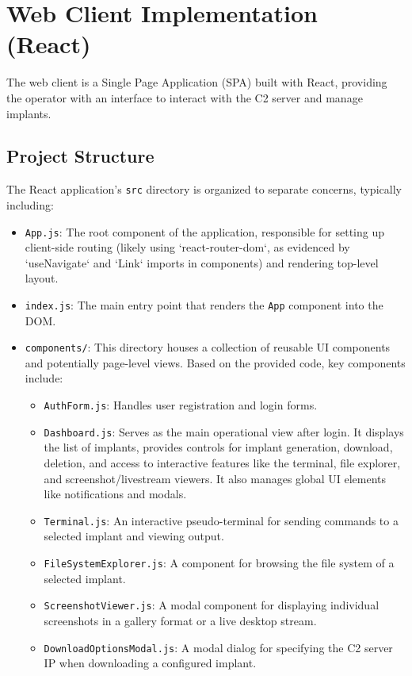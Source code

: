 \section{Web Client Implementation (React)}
The web client is a Single Page Application (SPA) built with React, providing the operator with an interface to interact with the C2 server and manage implants.

\subsection{Project Structure}
The React application's \texttt{src} directory is organized to separate concerns, typically including:
\begin{itemize}
    \item \texttt{App.js}: The root component of the application, responsible for setting up client-side routing (likely using `react-router-dom`, as evidenced by `useNavigate` and `Link` imports in components) and rendering top-level layout.
    \item \texttt{index.js}: The main entry point that renders the \texttt{App} component into the DOM.
    \item \texttt{components/}: This directory houses a collection of reusable UI components and potentially page-level views. Based on the provided code, key components include:
        \begin{itemize}
            \item \texttt{AuthForm.js}: Handles user registration and login forms.
            \item \texttt{Dashboard.js}: Serves as the main operational view after login. It displays the list of implants, provides controls for implant generation, download, deletion, and access to interactive features like the terminal, file explorer, and screenshot/livestream viewers. It also manages global UI elements like notifications and modals.
            \item \texttt{Terminal.js}: An interactive pseudo-terminal for sending commands to a selected implant and viewing output.
            \item \texttt{FileSystemExplorer.js}: A component for browsing the file system of a selected implant.
            \item \texttt{ScreenshotViewer.js}: A modal component for displaying individual screenshots in a gallery format or a live desktop stream.
            \item \texttt{DownloadOptionsModal.js}: A modal dialog for specifying the C2 server IP when downloading a configured implant.

\end{itemize}
\end{itemize}
